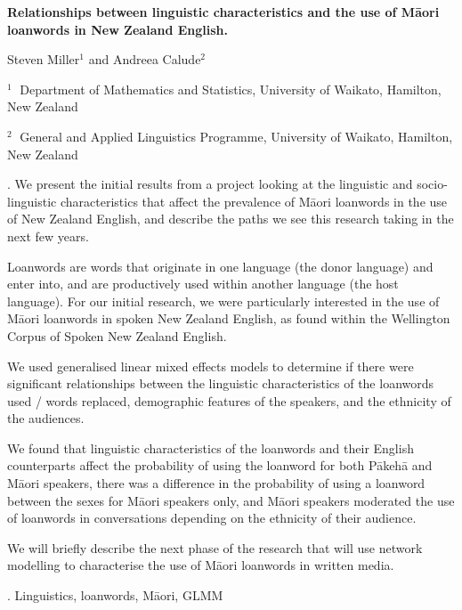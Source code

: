 \documentclass[12pt]{article}
\begin{document}
\begin{flushleft}


{\LARGE\bf Relationships between linguistic characteristics and the use of M\={a}ori loanwords in New Zealand English.}


\vspace{1.0cm}

Steven Miller$^1$ and Andreea Calude$^2$

\begin{description}

\item $^1 \;$ Department of Mathematics and Statistics, University of Waikato,
Hamilton, New Zealand

\item $^2 \;$ General and Applied Linguistics Programme, University of Waikato,
Hamilton, New Zealand

\end{description}

\end{flushleft}


\vspace{0.75cm}

. We present the initial results from a project looking at the linguistic and socio-linguistic characteristics that affect the prevalence of M\={a}ori loanwords in the use of New Zealand English, and describe the paths we see this research taking in the next few years. 

Loanwords are words that originate in one language (the donor language) and enter into, and are productively used within another language (the host language). For our initial research, we were particularly interested in the use of M\={a}ori loanwords in spoken New Zealand English, as found within the Wellington Corpus of Spoken New Zealand English. 

We used generalised linear mixed effects models to determine if there were significant relationships between the linguistic characteristics of the loanwords used / words replaced, demographic features of the speakers, and the ethnicity of the audiences. 

We found that linguistic characteristics of the loanwords and their English counterparts affect the probability of using the loanword for both P\={a}keh\={a} and M\={a}ori speakers, there was a difference in the probability of using a loanword between the sexes for M\={a}ori speakers only, and M\={a}ori speakers moderated the use of loanwords in conversations depending on the ethnicity of their audience.

We will briefly describe the next phase of the research that will use network modelling to characterise the use of M\={a}ori loanwords in written media.

\vskip 2mm

.
Linguistics, loanwords, M\={a}ori, GLMM
\end{document}
